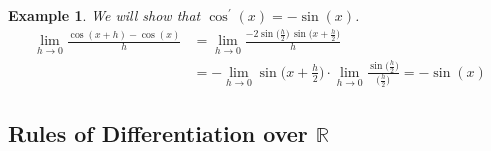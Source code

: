 \documentclass{article}
\newtheorem{example}{Example}[section]
\theoremstyle{remark}
\theoremstyle{definition}
\begin{document}
\begin{example}
We will show that $\cos^\prime (x) = - \sin(x)$. 
\begin{align*}
    \lim_{h\rightarrow 0} \frac{\cos(x+h) - \cos(x)}{h} & = \lim_{h \rightarrow 0} \frac{-2 \sin \big(\frac{h}{2}\big) \, \sin \big( x + \frac{h}{2}\big)}{h} \\
    & = - \lim_{h\rightarrow 0} \sin \Big( x + \frac{h}{2} \Big) \cdot \lim_{h\rightarrow0} \frac{\sin\big(\frac{h}{2} \big)}{\big( \frac{h}{2} \big)} = -\sin(x)
\end{align*}
\end{example}

\subsection[Rules of Differentation over R]{Rules of Differentiation over \(\mathbb{R}\)}
\end{document}
